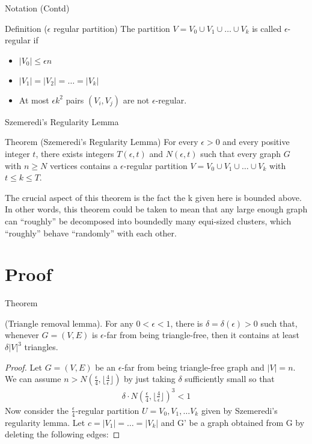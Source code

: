 \documentclass[10pt]{beamer}
\begin{document}
\begin{frame}{Notation (Contd)}
	\begin{block}{Definition ($\epsilon$ regular partition)}
		The partition $V = V_0 \cup V_1 \cup \dots \cup V_k$ is called $\epsilon$-regular if 
		\begin{itemize}
			\item $|V_0| \leq \epsilon n$
			\item $|V_1| = |V_2| = \dots = |V_k|$
			\item At most $\epsilon k^2$ pairs $(V_i, V_j)$ are not $\epsilon$-regular.
		\end{itemize}
	\end{block}
\end{frame}

\begin{frame}{Szemeredi's Regularity Lemma}
	\begin{block}{Theorem (Szemeredi's Regularity Lemma)}
		For every $\epsilon > 0$ and every positive integer $t$, there exists integers $T(\epsilon, t)$ and $N(\epsilon, t)$ such that every graph $G$ with $n \geq N$ vertices contains a $\epsilon$-regular partition $V = V_0 \cup V_1 \cup \dots \cup V_k$ with $t \leq k \leq T$.
	\end{block}

	The crucial aspect of this theorem is the fact the k given here is
	bounded above.
	In other words, this theorem could be taken to mean that any large
	enough graph can “roughly” be decomposed into boundedly many
	equi-sized clusters, which “roughly” behave “randomly” with each
	other.
	
\end{frame}

\section{Proof}
\begin{frame}{Theorem}

    \begin{theorem} \label{thm:theorem1}
      (Triangle removal lemma). For any $0 < \epsilon < 1$, there is $\delta = \delta(\epsilon) > 0 $
such that, whenever $G = (V, E)$ is $\epsilon$-far from being triangle-free, then it contains
at least $\delta |V|^{3}$
triangles.
    \end{theorem}

    \begin{proof}
     Let $G = (V, E)$ be an $\epsilon$-far from being triangle-free graph and $|V| = n$. We
can assume $ n > N(\frac{\epsilon}{4}, \lfloor \frac{4}{\epsilon} \rfloor)$ by just taking $\delta$ sufficiently small so that
	\begin{align*}
		\delta \cdot N(\frac{\epsilon}{4}, \lfloor \frac{4}{\epsilon} \rfloor)^3 < 1
	\end{align*} 
	Now consider the $\frac{\epsilon}{4}$-regular partition $U = {V_{0}, V_{1}, \dots V_{k}}$ given by Szemeredi’s regularity lemma. Let
	$c = |V_{1}| = \dots = |V_{k}|$ and G' be a graph obtained from G by deleting the following edges:
	\end{proof}
\end{frame}    
\end{document}
